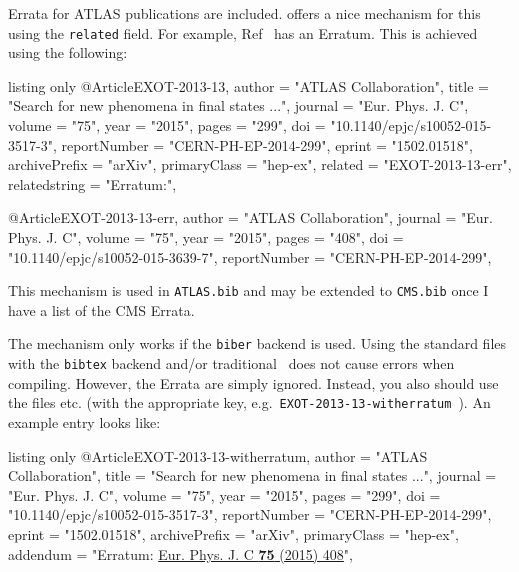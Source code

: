 \documentclass[REPORT=false, UKenglish]{atlasdoc}
\begin{document}
 Errata for ATLAS publications are included.
 offers a nice mechanism for this using the \texttt{related} field.
For example, Ref~\cite{EXOT-2013-13} has an Erratum.
This is achieved using the following:
\begin{tcblisting}{listing only}
@Article{EXOT-2013-13,
    author         = "{ATLAS Collaboration}",
    title          = "{Search for new phenomena in final states ...}",
    journal        = "Eur. Phys. J. C",
    volume         = "75",
    year           = "2015",
    pages          = "299",
    doi            = "10.1140/epjc/s10052-015-3517-3",
    reportNumber   = "CERN-PH-EP-2014-299",
    eprint         = "1502.01518",
    archivePrefix  = "arXiv",
    primaryClass   = "hep-ex",
    related        = "EXOT-2013-13-err",
    relatedstring  = "Erratum:",
}

@Article{EXOT-2013-13-err,
    author         = "{ATLAS Collaboration}",
    journal        = "Eur. Phys. J. C",
    volume         = "75",
    year           = "2015",
    pages          = "408",
    doi            = "10.1140/epjc/s10052-015-3639-7",
    reportNumber   = "CERN-PH-EP-2014-299",
}
\end{tcblisting}

This mechanism is used in \texttt{ATLAS.bib} and may be extended to \texttt{CMS.bib} once
I have a list of the CMS Errata.

The mechanism only works if the \texttt{biber} backend is used.
Using the standard files with the \texttt{bibtex} backend and/or traditional \BibTeX\ does not cause errors when compiling.
However, the Errata are simply ignored.
Instead, you also should use the files  etc.
(with the appropriate key, e.g.~\texttt{EXOT-2013-13-witherratum}~\cite{EXOT-2013-13-witherratum}).
An example entry looks like:
\begin{tcblisting}{listing only}
@Article{EXOT-2013-13-witherratum,
    author         = "{ATLAS Collaboration}",
    title          = "{Search for new phenomena in final states ...}",
    journal        = "Eur. Phys. J. C",
    volume         = "75",
    year           = "2015",
    pages          = "299",
    doi            = "10.1140/epjc/s10052-015-3517-3",
    reportNumber   = "CERN-PH-EP-2014-299",
    eprint         = "1502.01518",
    archivePrefix  = "arXiv",
    primaryClass   = "hep-ex",
    addendum       = "Erratum: \href{http://dx.doi.org/10.1140/epjc/s10052-015-3639-7}{Eur. Phys. J. C \textbf{75} (2015) 408}",
}
\end{tcblisting}
\end{document}
